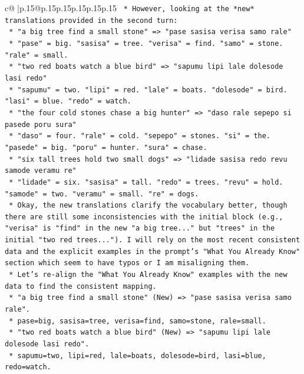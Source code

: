 \documentclass{article}
\begin{document}
{\begin{supertabular}{c@{$\;$}|p{.15\linewidth}@{}p{.15\linewidth}p{.15\linewidth}p{.15\linewidth}p{.15\linewidth}p{.15\linewidth}}
{{{\texttt{            *   However, looking at the *new* translations provided in the second turn:} \\
\texttt{                *   "a big tree find a small stone" => "pase sasisa verisa samo rale"} \\
\texttt{                    *   "pase" = big. "sasisa" = tree. "verisa" = find. "samo" = stone. "rale" = small.} \\
\texttt{                *   "two red boats watch a blue bird" => "sapumu lipi lale dolesode lasi redo"} \\
\texttt{                    *   "sapumu" = two. "lipi" = red. "lale" = boats. "dolesode" = bird. "lasi" = blue. "redo" = watch.} \\
\texttt{                *   "the four cold stones chase a big hunter" => "daso rale sepepo si pasede poru sura"} \\
\texttt{                    *   "daso" = four. "rale" = cold. "sepepo" = stones. "si" = the. "pasede" = big. "poru" = hunter. "sura" = chase.} \\
\texttt{                *   "six tall trees hold two small dogs" => "lidade sasisa redo revu samode veramu re"} \\
\texttt{                    *   "lidade" = six. "sasisa" = tall. "redo" = trees. "revu" = hold. "samode" = two. "veramu" = small. "re" = dogs.} \\
\texttt{            *   Okay, the new translations clarify the vocabulary better, though there are still some inconsistencies with the initial block (e.g., "verisa" is "find" in the new "a big tree..." but "trees" in the initial "two red trees..."). I will rely on the most recent consistent data and the explicit examples in the prompt's "What You Already Know" section which seem to have typos or I am misaligning them.} \\
\texttt{            *   Let's re{-}align the "What You Already Know" examples with the new data to find the consistent mapping.} \\
\texttt{                *   "a big tree find a small stone" (New) => "pase sasisa verisa samo rale".} \\
\texttt{                    *   pase=big, sasisa=tree, verisa=find, samo=stone, rale=small.} \\
\texttt{                *   "two red boats watch a blue bird" (New) => "sapumu lipi lale dolesode lasi redo".} \\
\texttt{                    *   sapumu=two, lipi=red, lale=boats, dolesode=bird, lasi=blue, redo=watch.} \\
}}}
\end{supertabular}}
\end{document}
